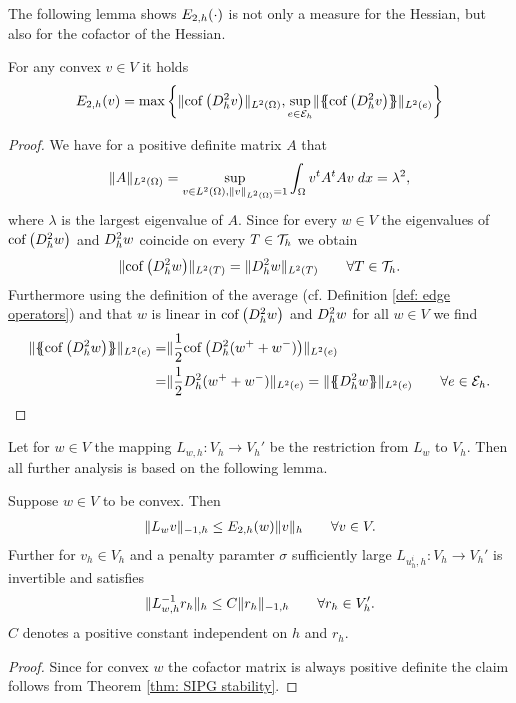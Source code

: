 The following lemma shows $E_{2,h}(\cdot)$ is not only a measure for the Hessian, but also for the cofactor of the Hessian.
\begin{lemma} \label{la: epsilon cof hess equal}
	For any convex $v \in V$ it holds
	\[
		E_{2,h}(v) = \operatorname{max} \left\{  \lVert \operatorname{cof} \left( D_h^2 v \right) \rVert_{L^2(\Omega)},  \sup_{e \in \mathcal{E}_h} \lVert \{\!\!\{ \operatorname{cof} \left( D_h^2 v \right) \}\!\!\} \rVert_{L^2(e)} \right\} 
	\]
\end{lemma}
\begin{proof}
	We have for a positive definite matrix $A$ that 
	\begin{align*}
	\lVert A \rVert_{L^2(\Omega)} =  \sup_{v \in L^2(\Omega), \lVert v \rVert_{L^2(\Omega)}=1} \int_{\Omega} {{v^t A^t A v}\;dx} = \lambda^2,
	\end{align*}
	where $\lambda$ is the largest eigenvalue of $A$. Since for every $w \in V$ the eigenvalues of $\operatorname{cof} \left( D_h^2 w \right)$ and $D_h^2 w$ coincide on every $T \in \mathcal{T}_h$ we obtain 
	\begin{align}
	\lVert \operatorname{cof} \left( D_h^2 w \right) \rVert_{L^2(T)} = \lVert D_h^2 w \rVert_{L^2(T)} \qquad \forall T \in \mathcal{T}_h.\label{eq: equality norm}
	\end{align}
	Furthermore using the definition of the average (cf. Definition \ref{def: edge operators}) and that $w$ is linear in $\operatorname{cof} \left( D_h^2 w \right)$ and $D_h^2 w$ for all $w \in V$ we find
	\begin{align}
	\LTwonormE{\average {\cofHessH{w}}} 
	=& \LTwonormE{\frac 1 2 {\cofHessH{(w^+ + w^-)}}} \nonumber\\
	=& \LTwonormE{\frac 1 2 {\hess{(w^+ + w^-)}}} 
	= \LTwonormE{\average {\hess{w}}} \qquad \forall e \in \edges. \label{eq: equality norm average}
	\end{align}
	\phantom{blub}
\end{proof}

Let for $w \in V$ the mapping $L_{w,h}:V_h \rightarrow V_h'$ be the restriction from $L_w$ to $V_h$. Then all further analysis is based on the following lemma.
\begin{lemma}[Stability] \label{la: stability L}
	Suppose $w \in V$ to be convex. Then 
	\begin{align}
		\lVert L_{w}v \rVert_{-1,h} \leq E_{2,h}(w) \lVert v \rVert_{h} \qquad \forall v \in V.
	\end{align}
	Further for $v_h \in V_h$ and a penalty paramter $\sigma $ sufficiently large $L_{u^i_h,h}: V_h \rightarrow V_h'$ is invertible and satisfies
	\begin{align}
		\lVert L_{w,h}^{-1} r_h \rVert_{h} \leq C \lVert r_h \rVert_{-1,h} \qquad \forall r_h \in V_h'.
	\end{align}
	$C$ denotes a positive constant independent on $h$ and $r_h$. 
\end{lemma}
\begin{proof}
	Since for convex $w$ the cofactor matrix is always positive definite the claim follows from Theorem \ref{thm: SIPG stability}.
\end{proof}

